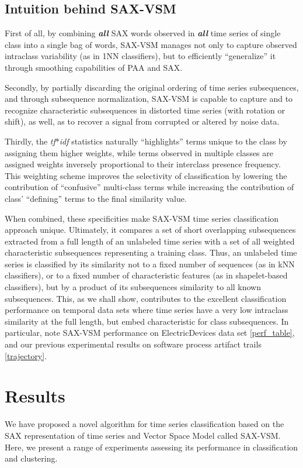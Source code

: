 \documentclass{llncs}
\begin{document}
\subsection{Intuition behind SAX-VSM}
First of all, by combining \textit{\textbf{all}} SAX words observed in \textit{\textbf{all}}
time series of single class into a single bag of words, SAX-VSM manages not only to capture 
observed intraclass variability (as in 1NN classifiers), but to efficiently ``generalize''  it through 
smoothing capabilities of PAA and SAX.  

Secondly, by partially discarding the original ordering of time series subsequences, and
through subsequence normalization, SAX-VSM is capable to capture and to recognize 
characteristic subsequences in distorted time series (with rotation or shift), as well,
as to recover a signal from corrupted or altered by noise data. 

Thirdly, the \textit{tf$\ast$idf} statistics naturally ``highlights'' terms unique to the
class by assigning them higher weights, while terms observed in multiple classes are 
assigned weights inversely proportional to their interclass presence frequency. 
This weighting scheme improves the selectivity of classification by  lowering the 
contribution of ``confusive'' multi-class terms while increasing  the contribution 
of  class' ``defining'' terms to the final similarity value.   

When combined, these specificities make SAX-VSM time series classification approach 
unique. Ultimately, it compares a set of short overlapping subsequences extracted from a 
full length of an unlabeled time series with a set of all weighted characteristic subsequences
representing a training class.
Thus, an unlabeled time series is classified by its similarity not to a fixed number 
of sequences (as in kNN classifiers), or to a fixed number of characteristic features 
(as in shapelet-based classifiers), but by a product of its subsequences similarity to all 
known subsequences.
This, as we shall show, contributes to the excellent classification performance on temporal 
data sets where time series have a very low intraclass similarity at the full length, but 
embed characteristic for class subsequences. In particular, note SAX-VSM performance 
on ElectricDevices data set \ref{perf_table}, and our previous experimental results on 
software process artifact trails \ref{trajectory}.

\enlargethispage{0.5cm} 
\section{Results}
We have proposed a novel algorithm for time series classification based on the SAX
representation of time series and Vector Space Model called SAX-VSM. Here, we present 
a range of experiments assessing its performance in classification and clustering.
\end{document}

